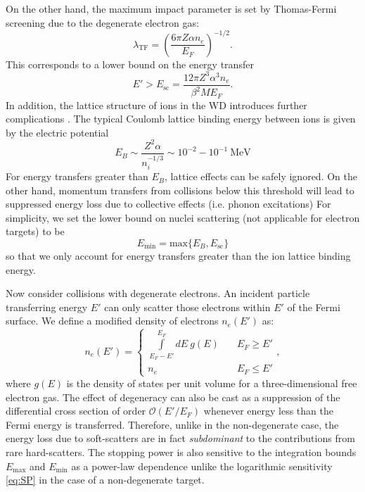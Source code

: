 \documentclass[twocolumn,showpacs,preprintnumbers,amsmath,amssymb,prd]{revtex4}
\def\r{\right)}
\def\l{\left(}
\begin{document}
\begin{appendices}
On the other hand, the maximum impact parameter is set by Thomas-Fermi screening due to the degenerate electron gas:
\begin{equation}
\label{eq:TF}
\lambda_{\text{TF}} = \l \frac{6 \pi Z \alpha n_e}{E_F}\r^{-1/2}.
\end{equation}
This corresponds to a lower bound on the energy transfer
\begin{equation}
E' > E_{\text{sc}} = \frac{12 \pi Z^3 \alpha ^3 n_e}{\beta^2 M E_F}.
\end{equation}
In addition, the lattice structure of ions in the WD introduces further complications \cite{Teukolsky}. The typical Coulomb lattice binding energy between ions is given by the electric potential
\begin{equation}
\label{eq:lattice}
E_B \sim \frac{Z^2 \alpha}{n_i^{-1/3}} \sim 10^{-2} - 10^{-1} ~\text{MeV}
\end{equation}
For energy transfers greater than $E_B$, lattice effects can be safely ignored. On the other hand, momentum transfers from collisions below this threshold will lead to suppressed energy loss due to collective effects (i.e. phonon excitations) For simplicity, we set the lower bound on nuclei scattering (not applicable for electron targets) to be
\begin{equation}
E_{\text{min}} = \text{max} \{E_B,E_{\text{sc}}\}
\end{equation}
so that we only account for energy transfers greater than the ion lattice binding energy.

Now consider collisions with degenerate electrons. An incident particle transferring energy $E'$ can only scatter those electrons within $E'$ of the Fermi surface. We define a modified density of electrons $n_e(E')$ as:
\begin{equation}
\label{pauli}
n_e(E') = \left\{
        \begin{array}{ll}
            \displaystyle \int \limits_{E_F -E'}^{E_F}dE ~g(E) & \quad E_F \geq E' \\
            n_e & \quad E_F \leq E'
        \end{array}
    \right.,
\end{equation}
where $g(E)$ is the density of states per unit volume for a three-dimensional free electron gas. The effect of degeneracy can also be cast as a suppression of the differential cross section of order $\mathcal{O}(E'/E_F)$ whenever energy less than the Fermi energy is transferred. Therefore, unlike in the non-degenerate case, the energy loss due to soft-scatters are in fact \emph{subdominant} to the contributions from rare hard-scatters. The stopping power is also sensitive to the integration bounds $E_{\text{max}}$ and $E_{\text{min}}$ as a power-law dependence unlike the logarithmic sensitivity \eqref{eq:SP} in the case of a non-degenerate target.


\end{appendices}
\end{document}
